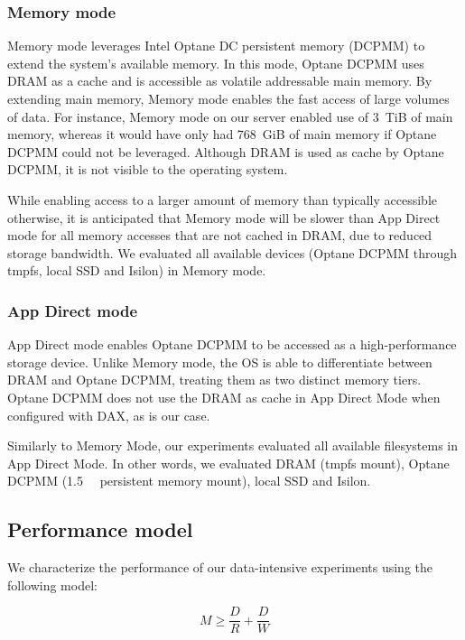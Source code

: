 \documentclass[conference]{IEEEtran}
\begin{document}
\subsubsection{Memory mode}

Memory mode leverages Intel Optane DC persistent memory (DCPMM) to extend the system's available
memory. In this mode, Optane DCPMM uses DRAM as a cache and is accessible as
volatile addressable main memory. By extending main memory, Memory mode enables the
fast access of large volumes of data. For instance, Memory mode on our server enabled use of
3~TiB of main memory, whereas it would have only had 768~GiB of main memory if Optane DCPMM could not be
leveraged. Although DRAM is used as cache by Optane DCPMM, it is not visible to the operating system. 

While enabling access to a larger amount of memory than typically accessible otherwise,
it is anticipated that Memory mode will be slower than App Direct mode for all memory accesses that
are not cached in DRAM, due to reduced storage bandwidth. We evaluated all available devices (Optane DCPMM through tmpfs, local SSD and Isilon)
in Memory mode.

\subsubsection{App Direct mode}

App Direct mode enables Optane DCPMM to be accessed as a high-performance storage device.
Unlike Memory mode, the OS is able to differentiate between DRAM and Optane DCPMM,
treating them as two distinct memory tiers. Optane DCPMM
does not use the DRAM as cache in App Direct Mode when configured with DAX, as is our case.

Similarly to Memory Mode, our experiments evaluated all available filesystems in App Direct
Mode. In other words, we evaluated DRAM (tmpfs mount), Optane DCPMM (\SI{1.5}{\tebi\byte} persistent
memory mount), local SSD and Isilon.


\subsection{Performance model}

We characterize the performance of our data-intensive experiments using the following model:

\begin{equation}
    M \geq \frac{D}{R} + \frac{D}{W} \label{eq:makespan}
\end{equation}
\end{document}
